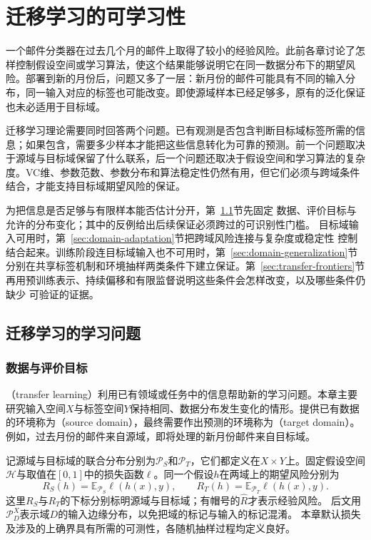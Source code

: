 \chapter{迁移学习的可学习性}
\label{chap:transfer-learning-theory}

一个邮件分类器在过去几个月的邮件上取得了较小的经验风险。此前各章讨论了怎样控制假设空间或学习算法，使这个结果能够说明它在同一数据分布下的期望风险。部署到新的月份后，问题又多了一层：新月份的邮件可能具有不同的输入分布，同一输入对应的标签也可能改变。即使源域样本已经足够多，原有的泛化保证也未必适用于目标域。

迁移学习理论需要同时回答两个问题。已有观测是否包含判断目标域标签所需的信息；如果包含，需要多少样本才能把这些信息转化为可靠的预测。前一个问题取决于源域与目标域保留了什么联系，后一个问题还取决于假设空间和学习算法的复杂度。VC维、参数范数、参数分布和算法稳定性仍然有用，但它们必须与跨域条件结合，才能支持目标域期望风险的保证。

为把信息是否足够与有限样本能否估计分开，第~\ref{sec:transfer-learning-setting}节先固定
数据、评价目标与允许的分布变化；其中的反例给出后续保证必须跨过的可识别性门槛。
目标域输入可用时，第~\ref{sec:domain-adaptation}节把跨域风险连接与复杂度或稳定性
控制结合起来。训练阶段连目标域输入也不可用时，第~\ref{sec:domain-generalization}节
分别在共享标签机制和环境抽样两类条件下建立保证。第~\ref{sec:transfer-frontiers}节
再用预训练表示、持续偏移和有限监督说明这些条件会怎样改变，以及哪些条件仍缺少
可验证的证据。

\section{迁移学习的学习问题}
\label{sec:transfer-learning-setting}

\subsection{数据与评价目标}
\label{sec:adaptation-generalization-settings}

（transfer learning）利用已有领域或任务中的信息帮助新的学习问题。本章主要研究输入空间$X$与标签空间$Y$保持相同、数据分布发生变化的情形。提供已有数据的环境称为（source domain），最终需要作出预测的环境称为（target domain）。例如，过去月份的邮件来自源域，即将处理的新月份邮件来自目标域。

记源域与目标域的联合分布分别为$\mathcal P_S$和$\mathcal P_T$，它们都定义在$X\times Y$上。固定假设空间$\mathcal H$与取值在$[0,1]$中的损失函数$\ell$。同一个假设$h$在两域上的期望风险分别为
\begin{equation}
 R_S(h)=\mathbb E_{\mathcal P_S}\ell(h(x),y),\qquad
 R_T(h)=\mathbb E_{\mathcal P_T}\ell(h(x),y).
 \label{eq:transfer-population-risks}
\end{equation}
这里$R_S$与$R_T$的下标分别标明源域与目标域；有帽号的$\hat R$才表示经验风险。
后文用$\mathcal P_D^X$表示域$D$的输入边缘分布，以免把域的标记与输入的标记混淆。
本章默认损失及涉及的上确界具有所需的可测性，各随机抽样过程均定义良好。

